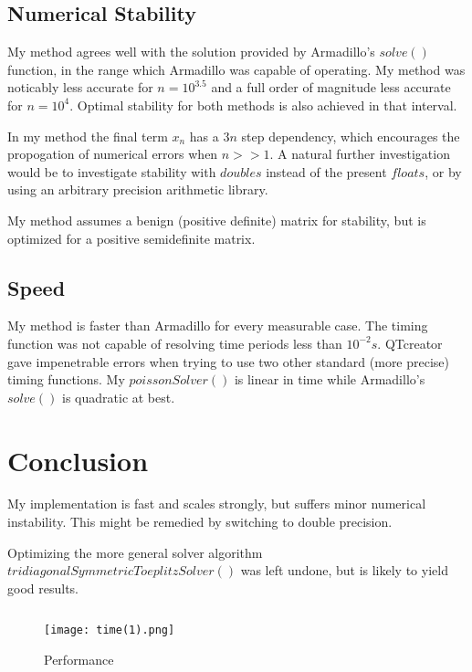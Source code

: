 \documentclass[10pt, conference, compsocconf]{IEEEtran}
\begin{document}
\subsection{Numerical Stability}
My method agrees well with the solution provided by Armadillo's $solve()$ function, in the range which Armadillo was capable of operating. My method was noticably less accurate for $n=10^{3.5}$ and a full order of magnitude less accurate for $n=10^4$. Optimal stability for both methods is also achieved in that interval. 

In my method the final term $x_n$ has a $3n$ step dependency, which encourages the propogation of numerical errors when $n>>1$. A natural further investigation would be to investigate stability with $doubles$ instead of the present $floats$, or by using an arbitrary precision arithmetic library.

My method assumes a benign (positive definite) matrix for stability, but is optimized for a positive semidefinite matrix.

\subsection{Speed}
My method is faster than Armadillo for every measurable case. The timing function was not capable of resolving time periods less than $10^{-2}s$. QTcreator gave impenetrable errors when trying to use two other standard (more precise) timing functions. My $poissonSolver()$ is linear in time while Armadillo's $solve()$ is quadratic at best. 


\section{Conclusion}
My implementation is fast and scales strongly, but suffers minor numerical instability. This might be remedied by switching to double precision.

Optimizing the more general solver algorithm $tridiagonalSymmetricToeplitzSolver()$ was left undone, but is likely to yield good results.

\newpage
$ $ 
\newpage
\begin{figure}[t]
\caption{Performance}
  \centering
    \texttt{[image: time(1).png]}
\end{figure}
\end{document}
